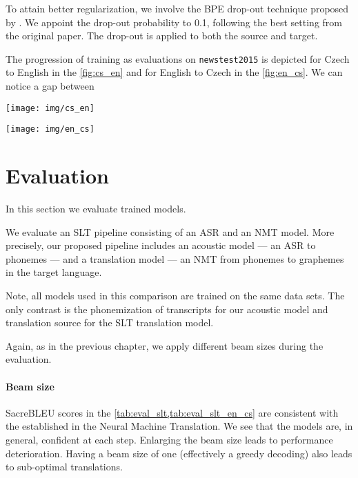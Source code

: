 To attain better regularization, we involve the BPE drop-out technique proposed by . We appoint the drop-out probability to 0.1, following the best setting from the original paper. The drop-out is applied to both the source and target.

The progression of training as evaluations on \texttt{newstest2015} is depicted for Czech to English in the \cref{fig:cs_en} and for English to Czech in the \cref{fig:en_cs}. We can notice a gap between 

\begin{figure*}[h]
	\texttt{[image: img/cs\_en]}
	\caption{Evaluations on newstest2015 during the training. Phonemized Czech side as source and (original, in graphemes) English side as target. Baseline model is tested on original source.}
	\label{fig:cs_en}
\end{figure*}

\begin{figure*}[h]
	\texttt{[image: img/en\_cs]}
	\caption{Evaluations on newstest2015 during the training. Phonemized English side as source and (original, in graphemes) Czech side as target. Baseline model is tested on original source.}
	\label{fig:en_cs}
\end{figure*}

\section{Evaluation}
\label{slt:evaluation}
In this section we evaluate trained models.

We evaluate an SLT pipeline consisting of an ASR and an NMT model. More precisely, our proposed pipeline includes an acoustic model --- an ASR to phonemes --- and a translation model --- an NMT from phonemes to graphemes in the target language. 

Note, all models used in this comparison are trained on the same data sets. The only contrast is the phonemization of transcripts for our acoustic model and translation source for the SLT translation model.

Again, as in the previous chapter, we apply different beam sizes during the evaluation.

\paragraph{Beam size} 
SacreBLEU scores in the \cref{tab:eval_slt,tab:eval_slt_en_cs} are consistent with the established in the Neural Machine Translation. We see that the models are, in general, confident at each step. Enlarging the beam size leads to performance deterioration. Having a beam size of one (effectively a greedy decoding) also leads to sub-optimal translations.


